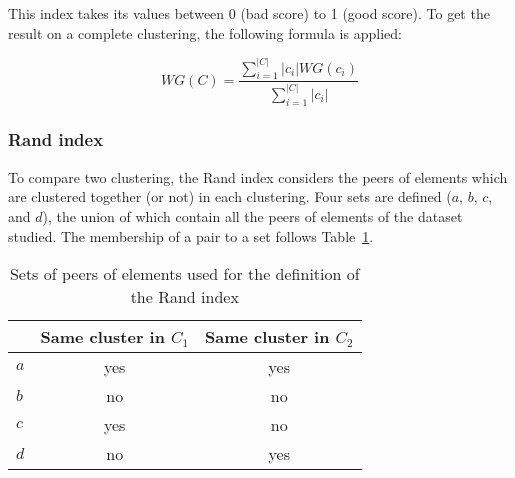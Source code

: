     This index takes its values between 0 (bad score) to 1 (good score). To get the result on a complete clustering, the following formula is applied:

    \begin{equation}
        WG(C) = \frac{\sum_{i=1}^{|C|} |c_i| WG(c_i)}{\sum_{i=1}^{|C|} |c_i|}
        \label{eq:wg_index_global}
    \end{equation}

    \subsubsection{Rand index}
    To compare two clustering, the Rand index considers the peers of elements 
    which are clustered together (or not) in each clustering. Four sets are 
    defined ($a$, $b$, $c$, and $d$), the union of which contain all the peers 
    of elements of the dataset studied. The membership of a pair to a set 
    follows Table~\ref{tab:rand_index}.
    
    \vspace{0.8cm}

    \begin{table}[h]
    \centering
    \begin{tabular}{lcc}
                                       & \multicolumn{1}{l}{\textbf{Same cluster in $C_1$}} & \multicolumn{1}{l}{\textbf{Same cluster in $C_2$}} \\ \bottomrule
    \multicolumn{1}{l}{\textbf{$a$}} & yes                                                 & yes                                                 \\ \bottomrule
    \multicolumn{1}{l}{\textbf{$b$}} & no                                                  & no                                                  \\ \bottomrule
    \multicolumn{1}{l}{\textbf{$c$}} & yes                                                 & no                                                  \\ \bottomrule
    \multicolumn{1}{l}{\textbf{$d$}} & no                                                  & yes                                                 \\ \bottomrule
    \end{tabular}
    \caption{Sets of peers of elements used for the definition of the Rand index}
\label{tab:rand_index}
    \end{table}

    \vspace{0.8cm}

